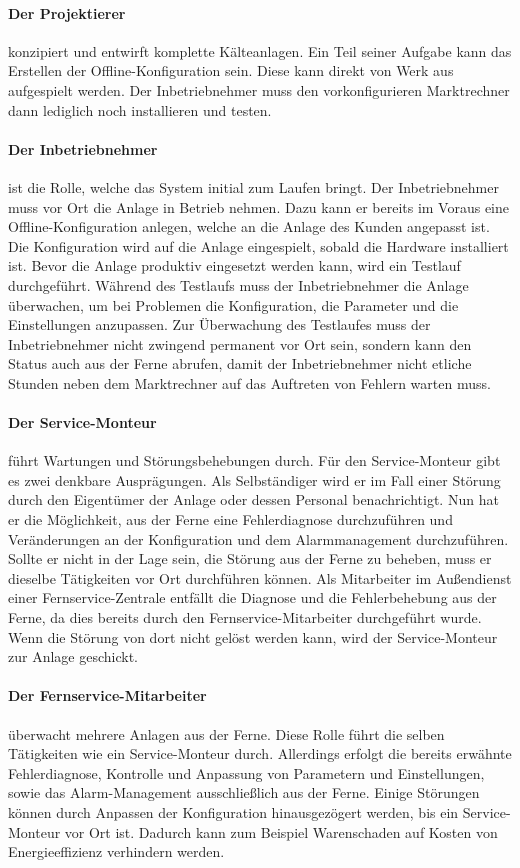 \documentclass[11pt,a4paper]{report}
\begin{document}
\paragraph{Der Projektierer} konzipiert und entwirft komplette Kälteanlagen. Ein Teil seiner Aufgabe kann das Erstellen der Offline-Konfiguration sein. Diese kann direkt von Werk aus aufgespielt werden. Der Inbetriebnehmer muss den vorkonfigurieren Marktrechner dann lediglich noch installieren und testen.

\paragraph{Der Inbetriebnehmer} ist die Rolle, welche das System initial zum Laufen bringt. Der Inbetriebnehmer muss vor Ort die Anlage in Betrieb nehmen. Dazu kann er bereits im Voraus eine Offline-Konfiguration anlegen, welche an die Anlage des Kunden angepasst ist. Die Konfiguration wird auf die Anlage eingespielt, sobald die Hardware installiert ist. Bevor die Anlage produktiv eingesetzt werden kann, wird ein Testlauf durchgeführt. Während des Testlaufs muss der Inbetriebnehmer die Anlage überwachen, um bei Problemen die Konfiguration, die Parameter und die Einstellungen anzupassen. Zur Überwachung des Testlaufes muss der Inbetriebnehmer nicht zwingend permanent vor Ort sein, sondern kann den Status auch aus der Ferne abrufen, damit der Inbetriebnehmer nicht etliche Stunden neben dem Marktrechner auf das Auftreten von Fehlern warten muss.

\paragraph{Der Service-Monteur} führt Wartungen und Störungsbehebungen durch. Für den Service-Monteur gibt es zwei denkbare Ausprägungen. Als Selbständiger wird er im Fall einer Störung durch den Eigentümer der Anlage oder dessen Personal benachrichtigt. Nun hat er die Möglichkeit, aus der Ferne eine Fehlerdiagnose durchzuführen und Veränderungen an der Konfiguration und dem Alarmmanagement durchzuführen. Sollte er nicht in der Lage sein, die Störung aus der Ferne zu beheben, muss er dieselbe Tätigkeiten vor Ort durchführen können. Als Mitarbeiter im Außendienst einer Fernservice-Zentrale entfällt die Diagnose und die Fehlerbehebung aus der Ferne, da dies bereits durch den Fernservice-Mitarbeiter durchgeführt wurde. Wenn die Störung von dort nicht gelöst werden kann, wird der Service-Monteur zur Anlage geschickt.

\paragraph{Der Fernservice-Mitarbeiter} überwacht mehrere Anlagen aus der Ferne. Diese Rolle führt die selben Tätigkeiten wie ein Service-Monteur durch. Allerdings erfolgt die bereits erwähnte Fehlerdiagnose, Kontrolle und Anpassung von Parametern und Einstellungen, sowie das Alarm-Management ausschließlich aus der Ferne. Einige Störungen können durch Anpassen der Konfiguration hinausgezögert werden, bis ein Service-Monteur vor Ort ist. Dadurch kann zum Beispiel Warenschaden auf Kosten von Energieeffizienz verhindern werden.
\end{document}
